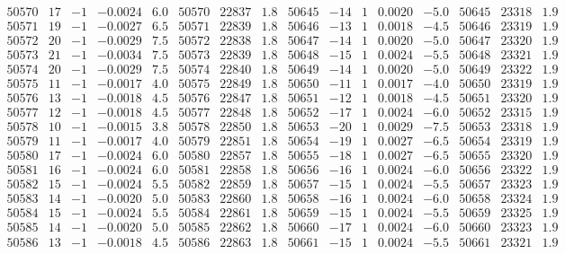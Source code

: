 \documentclass[11pt,reqno,a4letter]{article}
\numberwithin{figure}{section}
\numberwithin{table}{section}
\theoremstyle{plain}
\numberwithin{theorem}{section}
\theoremstyle{definition}
\begin{document}
\begin{table}[ht]
\begin{equation*}
{\begin{array}{ccccc|ccc||ccccc|ccc}
50570 & 17 & -1 & -0.0024 & 6.0 & 50570 & 22837 & 1.8 & 50645 & -14 & 1 & 0.0020 & -5.0 & 50645 & 23318 & 1.9  \\
50571 & 19 & -1 & -0.0027 & 6.5 & 50571 & 22839 & 1.8 & 50646 & -13 & 1 & 0.0018 & -4.5 & 50646 & 23319 & 1.9  \\
50572 & 20 & -1 & -0.0029 & 7.5 & 50572 & 22838 & 1.8 & 50647 & -14 & 1 & 0.0020 & -5.0 & 50647 & 23320 & 1.9  \\
50573 & 21 & -1 & -0.0034 & 7.5 & 50573 & 22839 & 1.8 & 50648 & -15 & 1 & 0.0024 & -5.5 & 50648 & 23321 & 1.9  \\
50574 & 20 & -1 & -0.0029 & 7.5 & 50574 & 22840 & 1.8 & 50649 & -14 & 1 & 0.0020 & -5.0 & 50649 & 23322 & 1.9  \\
50575 & 11 & -1 & -0.0017 & 4.0 & 50575 & 22849 & 1.8 & 50650 & -11 & 1 & 0.0017 & -4.0 & 50650 & 23319 & 1.9  \\
50576 & 13 & -1 & -0.0018 & 4.5 & 50576 & 22847 & 1.8 & 50651 & -12 & 1 & 0.0018 & -4.5 & 50651 & 23320 & 1.9  \\
50577 & 12 & -1 & -0.0018 & 4.5 & 50577 & 22848 & 1.8 & 50652 & -17 & 1 & 0.0024 & -6.0 & 50652 & 23315 & 1.9  \\
50578 & 10 & -1 & -0.0015 & 3.8 & 50578 & 22850 & 1.8 & 50653 & -20 & 1 & 0.0029 & -7.5 & 50653 & 23318 & 1.9  \\
50579 & 11 & -1 & -0.0017 & 4.0 & 50579 & 22851 & 1.8 & 50654 & -19 & 1 & 0.0027 & -6.5 & 50654 & 23319 & 1.9  \\
50580 & 17 & -1 & -0.0024 & 6.0 & 50580 & 22857 & 1.8 & 50655 & -18 & 1 & 0.0027 & -6.5 & 50655 & 23320 & 1.9  \\
50581 & 16 & -1 & -0.0024 & 6.0 & 50581 & 22858 & 1.8 & 50656 & -16 & 1 & 0.0024 & -6.0 & 50656 & 23322 & 1.9  \\
50582 & 15 & -1 & -0.0024 & 5.5 & 50582 & 22859 & 1.8 & 50657 & -15 & 1 & 0.0024 & -5.5 & 50657 & 23323 & 1.9  \\
50583 & 14 & -1 & -0.0020 & 5.0 & 50583 & 22860 & 1.8 & 50658 & -16 & 1 & 0.0024 & -6.0 & 50658 & 23324 & 1.9  \\
50584 & 15 & -1 & -0.0024 & 5.5 & 50584 & 22861 & 1.8 & 50659 & -15 & 1 & 0.0024 & -5.5 & 50659 & 23325 & 1.9  \\
50585 & 14 & -1 & -0.0020 & 5.0 & 50585 & 22862 & 1.8 & 50660 & -17 & 1 & 0.0024 & -6.0 & 50660 & 23323 & 1.9  \\
50586 & 13 & -1 & -0.0018 & 4.5 & 50586 & 22863 & 1.8 & 50661 & -15 & 1 & 0.0024 & -5.5 & 50661 & 23321 & 1.9  \\

\end{array}}
\end{equation*}
\end{table}
\end{document}
